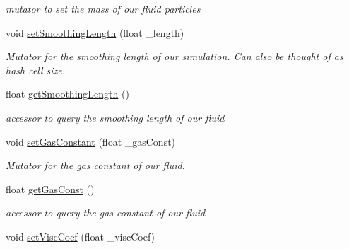 \begin{DoxyCompactItemize}
\begin{DoxyCompactList}\small\item\em mutator to set the mass of our fluid particles \end{DoxyCompactList}\item 
\hypertarget{class_s_p_h_engine_a196e04ba23d9d9c73924f3af8a8240ed}{void \hyperlink{class_s_p_h_engine_a196e04ba23d9d9c73924f3af8a8240ed}{set\-Smoothing\-Length} (float \-\_\-length)}\label{class_s_p_h_engine_a196e04ba23d9d9c73924f3af8a8240ed}

\begin{DoxyCompactList}\small\item\em Mutator for the smoothing length of our simulation. Can also be thought of as hash cell size. \end{DoxyCompactList}\item 
\hypertarget{class_s_p_h_engine_a5eebbb4eaf3c773e263396d49a76fc3e}{float \hyperlink{class_s_p_h_engine_a5eebbb4eaf3c773e263396d49a76fc3e}{get\-Smoothing\-Length} ()}\label{class_s_p_h_engine_a5eebbb4eaf3c773e263396d49a76fc3e}

\begin{DoxyCompactList}\small\item\em accessor to query the smoothing length of our fluid \end{DoxyCompactList}\item 
\hypertarget{class_s_p_h_engine_a293fc06859e21473b03626a55c5c3a69}{void \hyperlink{class_s_p_h_engine_a293fc06859e21473b03626a55c5c3a69}{set\-Gas\-Constant} (float \-\_\-gas\-Const)}\label{class_s_p_h_engine_a293fc06859e21473b03626a55c5c3a69}

\begin{DoxyCompactList}\small\item\em Mutator for the gas constant of our fluid. \end{DoxyCompactList}\item 
\hypertarget{class_s_p_h_engine_a683d29b540672f364c306b304bd50ea7}{float \hyperlink{class_s_p_h_engine_a683d29b540672f364c306b304bd50ea7}{get\-Gas\-Const} ()}\label{class_s_p_h_engine_a683d29b540672f364c306b304bd50ea7}

\begin{DoxyCompactList}\small\item\em accessor to query the gas constant of our fluid \end{DoxyCompactList}\item 
\hypertarget{class_s_p_h_engine_a296c06a01cb0a93dfa150c3acea64493}{void \hyperlink{class_s_p_h_engine_a296c06a01cb0a93dfa150c3acea64493}{set\-Visc\-Coef} (float \-\_\-visc\-Coef)}\label{class_s_p_h_engine_a296c06a01cb0a93dfa150c3acea64493}


\end{DoxyCompactItemize}
